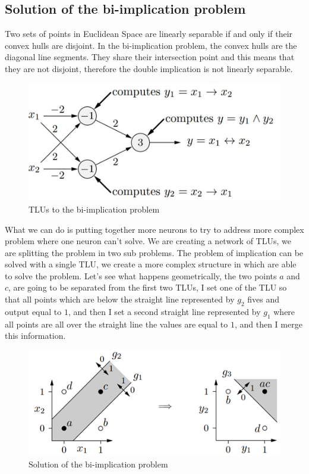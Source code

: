 \documentclass{article}
\begin{document}
\subsection{Solution of the bi-implication problem}
Two sets of points in Euclidean Space are linearly separable if and only if their convex hulls
are disjoint. In the bi-implication problem, the convex hulls are the diagonal line segments.
\newline\newline
They share their intersection point and this means that they are not disjoint, therefore
the double implication is not linearly separable.
\begin{figure}[H]
    \includegraphics[scale=0.6]{images/sol_bi_implic_problem.png}
    \centering
    \caption{TLUs to the bi-implication problem}
\end{figure}
\noindent
What we can do is putting together more neurons to try to address more complex problem where
one neuron can’t solve. We are creating a network of TLUs, we are splitting the problem in two
sub problems.
\newline\newline
The problem of implication can be solved with a single TLU, we create a more complex structure
in which are able to solve the problem.
\newline\newline
Let’s see what happens geometrically, the two points $a$ and $c$, are going to be separated
from the first two  TLUs, I set one of the TLU so that all points which are below the straight
line represented by $g_2$ fives and output equal to $1$, and then I set a second straight line
represented by $g_1$ where all points are all over the straight line the values are equal to $1$,
and then I merge this information.
\begin{figure}[H]
    \includegraphics[scale=0.8]{images/sol_bi_implic_problem_graph.png}
    \centering
    \caption{Solution of the bi-implication problem}
\end{figure}
\end{document}

